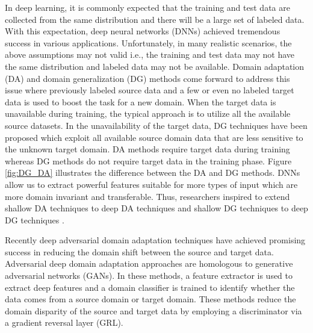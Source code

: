 \documentclass[review]{elsarticle}
\begin{document}
In deep learning, it is commonly expected that the training and test data are collected from the same distribution and there will be a large set of labeled data. With this expectation, deep neural networks (DNNs) achieved tremendous success in various applications. Unfortunately, in many realistic scenarios, the above assumptions may not valid i.e., the training and test data may not have the same distribution and labeled data may not be available. Domain adaptation (DA) and domain generalization (DG) methods come forward to address this issue where previously labeled source data and a few or even no labeled target data is used to boost the task for a new domain. When the target data is unavailable during training, the typical approach is to utilize all the available source datasets. In the unavailability of the target data, DG techniques have been proposed which exploit all available source domain data that are less sensitive to the unknown target domain. DA methods require target data during training whereas DG methods do not require target data in the training phase. Figure \ref{fig:DG_DA} illustrates the difference between the DA and DG methods. DNNs \cite{7560644,6987333,7469327} allow us to extract powerful features  suitable for more types of input which are more domain invariant and transferable. Thus, researchers inspired to extend shallow DA techniques \cite{Ben-David2010,6751384,6909579,6247911,6751479} to deep DA techniques \cite{DBLP:journals/corr/TzengHZSD14,DBLP:conf/icml/LongC0J15,DBLP:conf/nips/LongZ0J16,DBLP:conf/icml/LongZ0J17,dcoral,7410820,pmlr-v37-ganin15,8099799,carlucci2017auto,NIPS2016_6254} and shallow DG techniques \cite{Khosla:2012:UDD:2402940.2402953,DBLP:conf/iccv/GhifaryKZB15} to deep DG techniques \cite{8237853,8053784}. 



 

Recently deep adversarial domain adaptation techniques \cite{pmlr-v37-ganin15,8099799} have achieved promising success in reducing the domain shift between the source and target data. Adversarial deep domain adaptation approaches are homologous to generative adversarial networks (GANs)\cite{NIPS2014_5423}. In these methods, a feature extractor is used to extract deep features and a domain classifier is trained to identify whether the data comes from a source domain or target domain. These methods reduce the domain disparity of the source and target data by employing a discriminator via a gradient reversal layer (GRL). 
\end{document}
